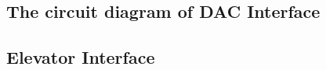 \documentclass[12pt]{report}
\begin{document}
\newpage
\subsection{The circuit diagram of DAC Interface}
\begin{figure}[H]
  \scalebox{0.7}{
    
  }
\end{figure}
\begin{figure}[H]
  \scalebox{0.7}{
    
  }
\end{figure}

\newpage
\subsection{Elevator Interface}
\begin{figure}[H]
  \scalebox{0.9}{
    
  }
\end{figure}

\newpage
\end{document}
